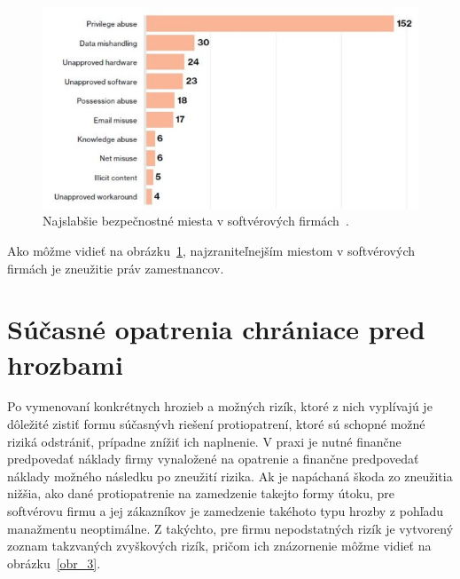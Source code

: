 \begin{figure}[H]
\begin{center}\includegraphics[width=\textwidth,height=6cm,keepaspectratio=true]{assets/priviledge_abuse.jpg}\end{center}
\caption[Najslabšie bezpečnostné miesta v softvérových firmách]{Najslabšie bezpečnostné miesta v softvérových firmách~\cite{WeaknestLink}.}\label{obr_2}
\end{figure}

\par Ako môžme vidieť na obrázku~\ref{obr_2}, najzraniteľnejším miestom v softvérových firmách je zneužitie práv zamestnancov.

\section{Súčasné opatrenia chrániace pred hrozbami}\label{sec:podsekcia-2}

\par Po vymenovaní konkrétnych hrozieb a možných rizík, ktoré z nich vyplívajú je dôležité zistiť formu súčasnývh riešení
protiopatrení, ktoré sú schopné možné riziká odstrániť, prípadne znížiť ich naplnenie. V praxi je nutné finančne predpovedať
náklady firmy vynaložené na opatrenie a finančne predpovedať náklady možného následku po zneužití rizika. Ak je napáchaná
škoda zo zneužitia nižšia, ako dané protiopatrenie na zamedzenie takejto formy útoku, pre softvérovu firmu a jej zákazníkov
je zamedzenie takéhoto typu hrozby z pohľadu manažmentu neoptimálne. Z takýchto, pre firmu nepodstatných rizík je vytvorený
zoznam takzvaných zvyškových rizík, pričom ich znázornenie môžme vidieť na obrázku~\ref{obr_3}.

